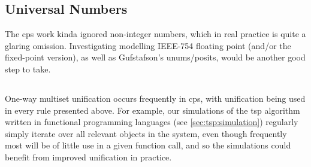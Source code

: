 

\subsection{Universal Numbers}
The \gls{cps} work kinda ignored non-integer numbers, which in real practice is quite a glaring omission.  Investigating modelling IEEE-754 floating point (and/or the fixed-point version), as well as Gufstafson's unums/posits, would be another good step to take.


\subsection{}
One-way multiset unification occurs frequently in \gls{cps}, with unification being used in every rule presented above.    For example, our simulations of the \gls{tsp} algorithm written in functional programming languages (see \cref{sec:tsp:simulation}) regularly simply iterate over all relevant objects in the system, even though frequently most will be of little use in a given function call, and so the simulations could benefit from improved unification in practice.

